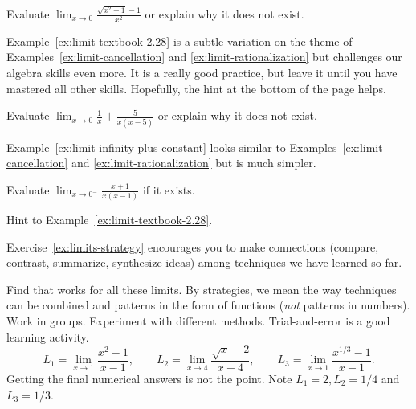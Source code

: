 \documentclass[../main.tex]{subfiles}
\begin{document}
\begin{example} \label{ex:limit-rationalization}
  Evaluate \(\lim_{x \to 0} \frac{\sqrt{x^{2}+1}-1}{x^{2}}\) or explain why it does not exist.

\end{example}
\clearpage

Example~\ref{ex:limit-textbook-2.28} is a subtle variation on the theme of Examples~\ref{ex:limit-cancellation} and \ref{ex:limit-rationalization} but challenges our algebra skills even more. It is a really good practice, but leave it until you have mastered all other skills. Hopefully, the hint at the bottom of the page helps.
\begin{exercise} \label{ex:limit-textbook-2.28}
  Evaluate \(\lim_{x \to 0} \frac{1}{x} + \frac{5}{x(x-5)}\) or explain why it does not exist.

\end{exercise}

Example~\ref{ex:limit-infinity-plus-constant} looks similar to Examples~\ref{ex:limit-cancellation} and \ref{ex:limit-rationalization} but is much simpler.
\begin{exercise} \label{ex:limit-infinity-plus-constant}
  Evaluate \(\lim_{x \to 0^{-}} \frac{x+1}{x(x-1)}\) if it exists.

\end{exercise}

\vfill{}
{\scriptsize Hint to Example~\ref{ex:limit-textbook-2.28}}. \newline
{}
\clearpage

Exercise~\ref{ex:limits-strategy} encourages you to make connections (compare, contrast, summarize, synthesize ideas) among techniques we have learned so far.
\begin{exercise} \label{ex:limits-strategy}
  Find  that works for all these limits.  By strategies, we mean the way techniques can be combined and patterns in the form of functions (\emph{not} patterns in numbers). Work in groups. Experiment with different methods. Trial-and-error is a good learning activity.
  \[
    L_{1} = \lim_{x \to 1} \frac{x^{2}-1}{x-1}, \qquad
    L_{2} = \lim_{x \to 4} \frac{\sqrt{x}-2}{x-4}, \qquad
    L_{3} = \lim_{x \to 1} \frac{x^{1/3}-1}{x-1}.
  \]
  Getting the final numerical answers is not the point. Note \(L_{1} = 2, L_{2} = 1/4\) and \(L_{3} = 1/3\).

\end{exercise}
\end{document}
